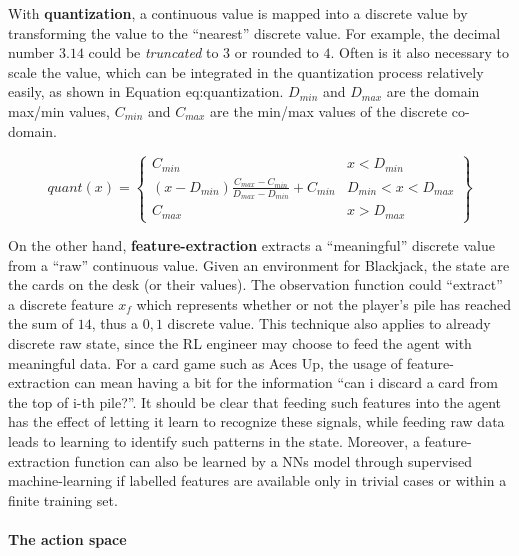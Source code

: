 With \textbf{quantization}, a continuous value is mapped into a discrete value by transforming the value to the ``nearest'' discrete value. For example, the decimal number $3.14$ could be \textit{truncated} to $3$ or rounded to $4$. Often is it also necessary to scale the value, which can be integrated in the quantization process relatively easily, as shown in Equation {eq:quantization}. $D_{min}$ and $D_{max}$ are the domain max/min values, $C_{min}$ and $C_{max}$ are the min/max values of the discrete co-domain.

\begin{equation}
  \label{eq:quantization}
  quant(x) = \left\{
  \begin{array}{cl}
  C_{min} & x < D_{min} \\
  (x - D_{min}) \frac{C_{max} - C_{min}} {D_{max} - D_{min}} + C_{min} & D_{min} < x < D_{max} \\
  C_{max} & x > D_{max}
  \end{array}
  \right\}
\end{equation}

      On the other hand, \textbf{feature-extraction} extracts a ``meaningful'' discrete value from a ``raw'' continuous value. Given an environment for Blackjack, the state are the cards on the desk (or their values). The observation function could ``extract'' a discrete feature $x_f$ which represents whether or not the player's pile has reached the sum of $14$, thus a ${0,1}$ discrete value. This technique also applies to already discrete raw state, since the RL engineer may choose to feed the agent with meaningful data. For a card game such as Aces Up, the usage of feature-extraction can mean having a bit for the information ``can i discard a card from the top of i-th pile?''. It should be clear that feeding such features into the agent has the effect of letting it learn to recognize these signals, while feeding raw data leads to learning to identify such patterns in the state. Moreover, a feature-extraction function can also be learned by a NNs model through supervised machine-learning if labelled features are available only in trivial cases or within a finite training set.

\paragraph{The action space}

